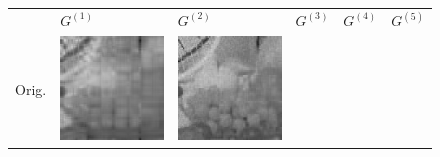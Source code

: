 \documentclass[11pt,a4paper,openright,oneside]{book}
\numberwithin{equation}{section}
\begin{document}
{\begin{figure}[h]
\begin{adjustwidth}{-3cm}{-3cm}

    \centering
\begin{tabular}{>{\centering\arraybackslash}m{1.5cm} m{2.5cm} m{2.5cm} m{2.5cm} m{2.5cm} m{2.5cm}}
        & \centering $G^{(1)}$ & \centering $G^{(2)}$ & \centering $G^{(3)}$ & \centering $G^{(4)}$ & \centering $G^{(5)}$ & \\
        Orig. &
        \includegraphics[width=\linewidth]{media/tnale/AAAfruits-comp1.png} &
        \includegraphics[width=\linewidth]{media/tnale/AAAfruits-comp2.png} &

\end{tabular}
\end{adjustwidth}
\end{figure}}
\end{document}
